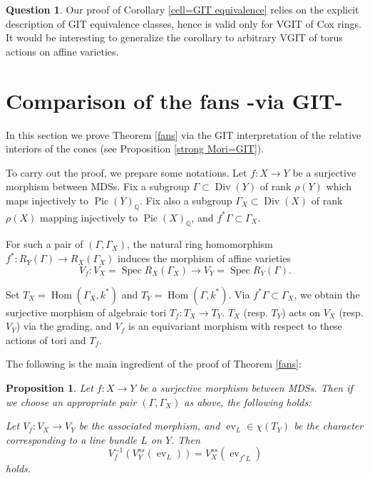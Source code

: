 \documentclass[12pt,twoside]{amsart}
\newtheorem{prop}[theo]{Proposition}
\theoremstyle{definition}
\newtheorem{ques}[theo]{Question}
\newcommand\Pic{\mathop{\mathrm{Pic}}\nolimits}
\newcommand\Hom{\mathop{\mathrm{Hom}}\nolimits}
\newcommand\Spec{\mathop{\mathrm{Spec}}\nolimits}
\newcommand\ev{\mathop{\mathrm{ev}}\nolimits}
\newcommand\Divi{\mathop{\mathrm{Div}}\nolimits}
\newcommand\bq{\mathbb{Q}}
\begin{document}
 \begin{ques}
 Our proof of Corollary \ref{cell=GIT equivalence} relies on the explicit description of GIT equivalence classes, hence
 is valid only for VGIT of Cox rings. It would be interesting to generalize the corollary to arbitrary VGIT of torus actions
 on affine varieties. 
 \end{ques}
\section{Comparison of the fans -via GIT-}\label{Comparison of the fans -via GIT-}

In this section we prove Theorem \ref{fans} via the GIT interpretation of the relative interiors of the cones
(see Proposition \ref{strong Mori=GIT}).

To carry out the proof, we prepare some notations.
Let $f:X\to Y$ be a surjective morphism between MDSs. Fix a subgroup $\Gamma\subset\Divi{(Y)}$
of rank $\rho{(Y)}$ which maps injectively to $\Pic{(Y)}_{\bq}$. Fix also a subgroup
$\Gamma_{X}\subset\Divi{(X)}$ of rank $\rho{(X)}$ mapping injectively to $\Pic{(X)}_{\bq}$, and
$f^{*}\Gamma\subset\Gamma_{X}$.

For such a pair of $(\Gamma, \Gamma_{X})$, the natural ring homomorphism $f^{*}: R_{Y}(\Gamma)
\to R_{X}(\Gamma_{X})$ induces the morphism of affine varieties
\begin{equation*}
V_f:V_X=\Spec R_{X}(\Gamma_{X})\to V_Y=\Spec R_{Y}(\Gamma).
\end{equation*}

Set $T_X=\Hom(\Gamma_{X},k^{*})$ and $T_Y=\Hom(\Gamma,k^{*})$. Via $f^{*}\Gamma\subset\Gamma_{X}$,
we obtain the surjective morphism of algebraic tori $T_f:T_X\to T_Y$.
$T_X$ (resp. $T_Y$) acts on $V_X$ (resp. $V_Y$) via the grading, and $V_f$ is an equivariant morphism
with respect to these actions of tori and $T_f$.



The following is the main ingredient of the proof of Theorem \ref{fans}:
\begin{prop}\label{ss loci and pull back}
Let $f:X\to Y$ be a surjective morphism between MDSs. 
Then if we choose an appropriate pair
$(\Gamma, \Gamma_{X})$ as above, the following holds:

Let $V_f:V_X\to V_Y$ be the associated morphism, and $\ev_{L}\in\chi{(T_Y)}$ be the
character corresponding to a line bundle $L$ on $Y$. Then
\begin{equation}
V_f^{-1}(V_Y^{ss}(\ev_L))=V_X^{ss}(\ev_{f^{*}L})
\end{equation}
holds. 
\end{prop}
\end{document}
